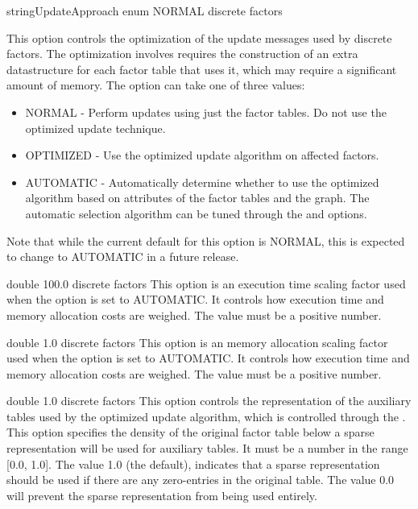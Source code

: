 {\ifmatlab string\fi \ifjava UpdateApproach enum\fi}
{NORMAL}
{discrete factors}
{This option controls the optimization of the update messages used by discrete factors. The optimization involves requires the construction of an extra datastructure for each factor table that uses it, which may require a significant amount of memory. The option can take one of three values:
\begin{itemize}
\item NORMAL - Perform updates using just the factor tables. Do not use the optimized update technique.
\item OPTIMIZED - Use the optimized update algorithm on affected factors.
\item AUTOMATIC - Automatically determine whether to use the optimized algorithm based on attributes of the factor tables and the graph. The automatic selection algorithm can be tuned through the  and  options.
\end{itemize}

Note that while the current default for this option is NORMAL, this is expected to change to AUTOMATIC in a future release.}


{double}
{100.0}
{discrete factors}
{This option is an execution time scaling factor used when the  option is set to AUTOMATIC. It controls how execution time and memory allocation costs are weighed. The value must be a positive number.}


{double}
{1.0}
{discrete factors}
{This option is an memory allocation scaling factor used when the  option is set to AUTOMATIC. It controls how execution time and memory allocation costs are weighed. The value must be a positive number.}


{double}
{1.0}
{discrete factors}
{This option controls the representation of the auxiliary tables used by the optimized update algorithm, which is controlled through the . This option specifies the density of the original factor table below a sparse representation will be used for auxiliary tables. It must be a number in the range [0.0, 1.0]. The value 1.0 (the default), indicates that a sparse representation should be used if there are any zero-entries in the original table. The value 0.0 will prevent the sparse representation from being used entirely.}

